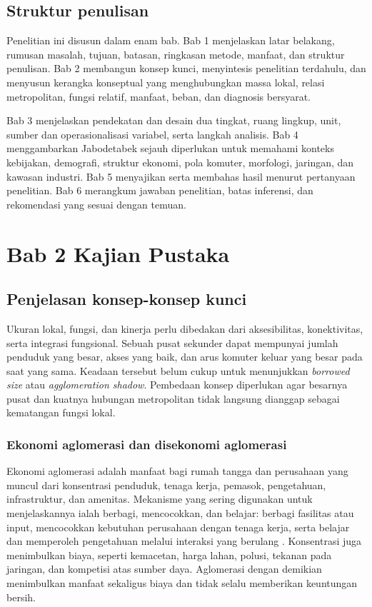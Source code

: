 \documentclass[12pt,a4paper,oneside,openany,indonesian]{report}
\begin{document}
\section{Struktur penulisan}

Penelitian ini disusun dalam enam bab. Bab 1 menjelaskan latar belakang, rumusan masalah, tujuan, batasan, ringkasan metode, manfaat, dan struktur penulisan. Bab 2 membangun konsep kunci, menyintesis penelitian terdahulu, dan menyusun kerangka konseptual yang menghubungkan massa lokal, relasi metropolitan, fungsi relatif, manfaat, beban, dan diagnosis bersyarat.

Bab 3 menjelaskan pendekatan dan desain dua tingkat, ruang lingkup, unit, sumber dan operasionalisasi variabel, serta langkah analisis. Bab 4 menggambarkan Jabodetabek sejauh diperlukan untuk memahami konteks kebijakan, demografi, struktur ekonomi, pola komuter, morfologi, jaringan, dan kawasan industri. Bab 5 menyajikan serta membahas hasil menurut pertanyaan penelitian. Bab 6 merangkum jawaban penelitian, batas inferensi, dan rekomendasi yang sesuai dengan temuan.

\clearpage

\chapter{Bab 2 Kajian Pustaka}

\section{Penjelasan konsep-konsep kunci}

Ukuran lokal, fungsi, dan kinerja perlu dibedakan dari aksesibilitas, konektivitas, serta integrasi fungsional. Sebuah pusat sekunder dapat mempunyai jumlah penduduk yang besar, akses yang baik, dan arus komuter keluar yang besar pada saat yang sama. Keadaan tersebut belum cukup untuk menunjukkan \emph{borrowed size} atau \emph{agglomeration shadow}. Pembedaan konsep diperlukan agar besarnya pusat dan kuatnya hubungan metropolitan tidak langsung dianggap sebagai kematangan fungsi lokal.

\subsection{Ekonomi aglomerasi dan disekonomi aglomerasi}

Ekonomi aglomerasi adalah manfaat bagi rumah tangga dan perusahaan yang muncul dari konsentrasi penduduk, tenaga kerja, pemasok, pengetahuan, infrastruktur, dan amenitas. Mekanisme yang sering digunakan untuk menjelaskannya ialah berbagi, mencocokkan, dan belajar: berbagi fasilitas atau input, mencocokkan kebutuhan perusahaan dengan tenaga kerja, serta belajar dan memperoleh pengetahuan melalui interaksi yang berulang \parencite{durantonpuga2004}. Konsentrasi juga menimbulkan biaya, seperti kemacetan, harga lahan, polusi, tekanan pada jaringan, dan kompetisi atas sumber daya. Aglomerasi dengan demikian menimbulkan manfaat sekaligus biaya dan tidak selalu memberikan keuntungan bersih.
\end{document}
